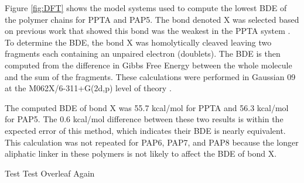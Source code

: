 \documentclass[journal=langd5,manuscript=article]{achemso}
\begin{document}
Figure \ref{fig:DFT} shows the model systems used to compute the 
lowest BDE of the polymer chains for PPTA and PAP5.
The bond denoted X was selected based on previous work 
that showed this bond was the weakest in the PPTA system \cite{mercer2017molecular}.
To determine the BDE, the bond X was homolytically cleaved leaving
two fragments each containing an unpaired electron (doublets).
The BDE is then computed from the
difference in Gibbs Free Energy between the whole
molecule and the sum of the fragments.
These calculations were performed in Gaussian 09 \cite{g09}
at the M062X/6-311+G(2d,p) level of theory \cite{zhao_2008,mclean_1980}.

The computed BDE of bond X was 55.7 kcal/mol for PPTA and
56.3 kcal/mol for PAP5.
The 0.6 kcal/mol difference between these two results is
within the expected error of this method, which indicates
their BDE is nearly equivalent.
This calculation was not repeated for PAP6, PAP7, and PAP8 because
the longer aliphatic linker in these polymers is not likely to affect the BDE of bond X.

Test
Test Overleaf Again
\FloatBarrier

\end{document}
